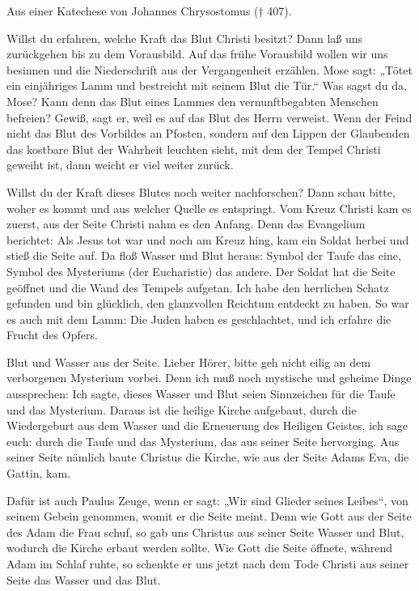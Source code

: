 \vspace{5pt}

Aus einer Katechese von Johannes Chrysostomus († 407).


\vspace{5pt}



\lettrine[lines=3]{W}{}illst du erfahren, welche Kraft das Blut Christi besitzt? Dann laß uns zurückgehen bis zu dem Vorausbild. Auf das frühe Vorausbild wollen wir uns besinnen und die Niederschrift aus der Vergangenheit erzählen. Mose sagt: „Tötet ein einjähriges Lamm und bestreicht mit seinem Blut die Tür.“ Was sagst du da, Mose? Kann denn das Blut eines Lammes den vernunftbegabten Menschen befreien? Gewiß, sagt er, weil es auf das Blut des Herrn verweist. Wenn der Feind nicht das Blut des Vorbildes an Pfosten, sondern auf den Lippen der Glaubenden das kostbare Blut der Wahrheit leuchten sieht, mit dem der Tempel Christi geweiht ist, dann weicht er viel weiter zurück. 

Willst du der Kraft dieses Blutes noch weiter nachforschen? Dann schau bitte, woher es kommt und aus welcher Quelle es entspringt. Vom Kreuz Christi kam es zuerst, aus der Seite Christi nahm es den Anfang. Denn das Evangelium berichtet: Als Jesus tot war und noch am Kreuz hing, kam ein Soldat herbei und stieß die Seite auf. Da floß Wasser und Blut heraus: Symbol der Taufe das eine, Symbol des Mysteriums (der Eucharistie) das andere. Der Soldat hat die Seite geöffnet und die Wand des Tempels aufgetan. Ich habe den herrlichen Schatz gefunden und bin glücklich, den glanzvollen Reichtum entdeckt zu haben. So war es auch mit dem Lamm: Die Juden haben es geschlachtet, und ich erfahre die Frucht des Opfers. 

Blut und Wasser aus der Seite. Lieber Hörer, bitte geh nicht eilig an dem verborgenen Mysterium vorbei. Denn ich muß noch mystische und geheime Dinge aussprechen: Ich sagte, dieses Wasser und Blut seien Sinnzeichen für die Taufe und das Mysterium. Daraus ist die heilige Kirche aufgebaut, durch die Wiedergeburt aus dem Wasser und die Erneuerung des Heiligen Geistes, ich sage euch: durch die Taufe und das Mysterium, das aus seiner Seite hervorging. Aus seiner Seite nämlich baute Christus die Kirche, wie aus der Seite Adams Eva, die Gattin, kam. 

Dafür ist auch Paulus Zeuge, wenn er sagt: „Wir sind Glieder seines Leibes“, von seinem Gebein genommen, womit er die Seite meint. Denn wie Gott aus der Seite des Adam die Frau schuf, so gab uns Christus aus seiner Seite Wasser und Blut, wodurch die Kirche erbaut werden sollte. Wie Gott die Seite öffnete, während Adam im Schlaf ruhte, so schenkte er uns jetzt nach dem Tode Christi aus seiner Seite das Wasser und das Blut.